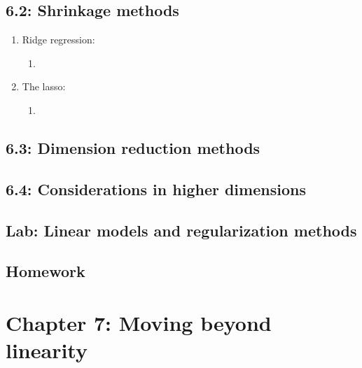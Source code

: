 \documentclass{article}
\begin{document}
\subsection*{6.2: Shrinkage methods}

\begin{enumerate}
\item Ridge regression:
\begin{enumerate}
\item 

\end{enumerate}

\item The lasso:
\begin{enumerate}
\item 

\end{enumerate}
\end{enumerate}

\subsection*{6.3: Dimension reduction methods}

\subsection*{6.4: Considerations in higher dimensions}

\subsection*{Lab: Linear models and regularization methods}

\subsection*{Homework}

\section*{Chapter 7: Moving beyond linearity} 
\end{document}
